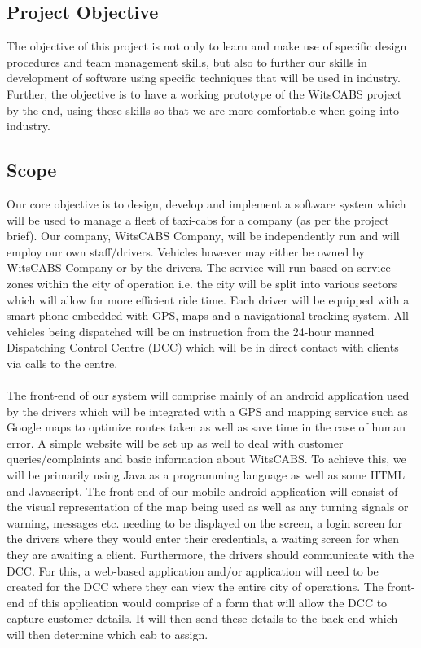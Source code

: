\documentclass[a4paper,12pt]{article}
\begin{document}
\subsection{Project Objective}
The objective of this project is not only to learn and make use of specific design procedures and team management skills, but also to further our skills in development of software using specific techniques that will be used in industry. Further, the objective is to have a working prototype of the WitsCABS project by the end, using these skills so that we are more comfortable when going into industry.
\newpage

\subsection{Scope}
Our core objective is to design, develop and implement a software system which will be used to manage a fleet of taxi-cabs for a company (as per the project brief). Our company, WitsCABS Company, will be independently run and will employ our own staff/drivers. Vehicles however may either be owned by WitsCABS Company or by the drivers. The service will run based on service zones within the city of operation i.e. the city will be split into various sectors which will allow for more efficient ride time. Each driver will be equipped with a smart-phone embedded with GPS, maps and a navigational tracking system. All vehicles being dispatched will be on instruction from the 24-hour manned Dispatching Control Centre (DCC) which will be in direct contact with clients via calls to the centre.
\\\\
The front-end of our system will comprise mainly of an android application used by the drivers which will be integrated with a GPS and mapping service such as Google maps to optimize routes taken as well as save time in the case of human error. A simple website will be set up as well to deal with customer queries/complaints and basic information about WitsCABS. To achieve this, we will be primarily using Java as a programming language as well as some HTML and Javascript. The front-end of our mobile android application will consist of the visual representation of the map being used as well as any turning signals or warning, messages etc. needing to be displayed on the screen, a login screen for the drivers where they would enter their credentials, a waiting screen for when they are awaiting a client. Furthermore, the drivers should communicate with the DCC. For this, a web-based application and/or application will need to be created for the DCC where they can view the entire city of operations. The front-end of this application would comprise of a form that will allow the DCC to capture customer details. It will then send these details to the back-end which will then determine which cab to assign.\\ \\
\end{document}

